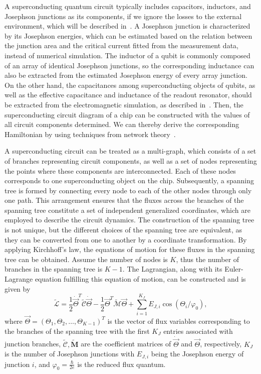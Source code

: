 \documentclass[a4paper,onecolumn,11pt,unpublished]{quantumarticle}
\begin{document}
A superconducting quantum circuit typically includes capacitors, inductors, and Josephson junctions as its components, if we ignore the losses to the external environment, which will be described in~. 
A Josephson junction is characterized by its Josephson energies, which can be estimated based on the relation between the junction area and the critical current fitted from the measurement data, instead of numerical simulation. The inductor of a qubit is commonly composed of an array of identical Josephson junctions, so the corresponding inductance can also be extracted from the estimated Josephson energy of every array junction. 
On the other hand, the capacitances among superconducting objects of qubits, as well as the effective capacitance and inductance of the readout resonator, should be extracted from the electromagnetic simulation, as described in~. Then, the superconducting circuit diagram of a chip can be constructed with the values of all circuit components determined. We can thereby derive the corresponding Hamiltonian by using techniques from network theory~\cite{Yurke1984Quantum, Burkard2004Multilevel, Burkard2005Circuit}.

A superconducting circuit can be treated as a multi-graph, which consists of a set of branches representing circuit components, as well as a set of nodes representing the points where these components are interconnected. Each of these nodes corresponds to one superconducting object on the chip. 
Subsequently, a spanning tree is formed by connecting every node to each of the other nodes through only one path. 
This arrangement ensures that the fluxes across the branches of the spanning tree constitute a set of independent generalized coordinates, which are employed to describe the circuit dynamics.
The construction of the spanning tree is not unique, but the different choices of the spanning tree are equivalent, as they can be converted from one to another by a coordinate transformation.
By applying Kirchhoff's law, the equations of motion for these fluxes in the spanning tree can be obtained. 
Assume the number of nodes is $K$, thus the number of branches in the spanning tree is $K-1$.
The Lagrangian, along with its Euler-Lagrange equation fulfilling this equation of motion, can be constructed and is given by
\begin{equation}
    \tilde{\mathcal{L}} = \frac{1}{2} \dot{\vec{\Theta}}^T \tilde{\mathcal{C}} \dot{\vec{\Theta}}
    - \frac{1}{2} \vec \Theta^T \tilde{\mathcal{M}} \vec \Theta
    + \sum_{i=1}^{K_J} E_{J, i} \cos\left(\Theta_i / \varphi_0\right),
    \label{eq:circuit_lagrangian}
\end{equation}
where $\vec{\Theta}=\left( \Theta_1, \Theta_2, \ldots, \Theta_{K-1} \right)^T$ is the vector of flux variables corresponding to the branches of the spanning tree with the first $K_J$ entries associated with junction branches, $\tilde{\mathcal{C}}, \tilde{\mathbf{M}}$ are the coefficient matrices of $\dot{\vec{\Theta}}$ and $\vec \Theta$, respectively, $K_J$ is the number of Josephson junctions with $E_{J, i}$ being the Josephson energy of junction $i$, and $\varphi_0 = \frac{\hbar}{2e}$ is the reduced flux quantum. 
\end{document}

